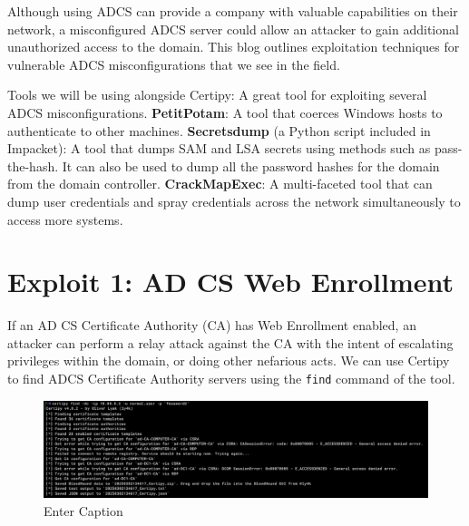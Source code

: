 Although using ADCS can provide a company with valuable capabilities on their network, a misconfigured ADCS server could allow an attacker to gain additional unauthorized access to the domain. This blog outlines exploitation techniques for vulnerable ADCS misconfigurations that we see in the field.

Tools we will be using alongside Certipy: A great tool for exploiting several ADCS misconfigurations.
\textbf{PetitPotam}: A tool that coerces Windows hosts to authenticate to other machines.
\textbf{Secretsdump} (a Python script included in Impacket): A tool that dumps SAM and LSA secrets using methods such as pass-the-hash. It can also be used to dump all the password hashes for the domain from the domain controller.
\textbf{CrackMapExec}: A multi-faceted tool that can dump user credentials and spray credentials across the network simultaneously to access more systems.

\section{Exploit 1: AD CS Web Enrollment}
If an AD CS Certificate Authority (CA) has Web Enrollment enabled, an attacker can perform a relay attack against the CA with the intent of escalating privileges within the domain, or doing other nefarious acts. We can use Certipy to find ADCS Certificate Authority servers using the \verb|find| command of the tool.

\begin{notebox}
\begin{minted}
certipy find -dc-ip DC IP Address} -u {User} -p {Password}
\end{verbatim}
\end{notebox}

\begin{figure}
    \centering
    \includegraphics[width=0.75\linewidth]{certipy2.png}
    \caption{Enter Caption}
    \label{fig:placeholder}
\end{figure}


